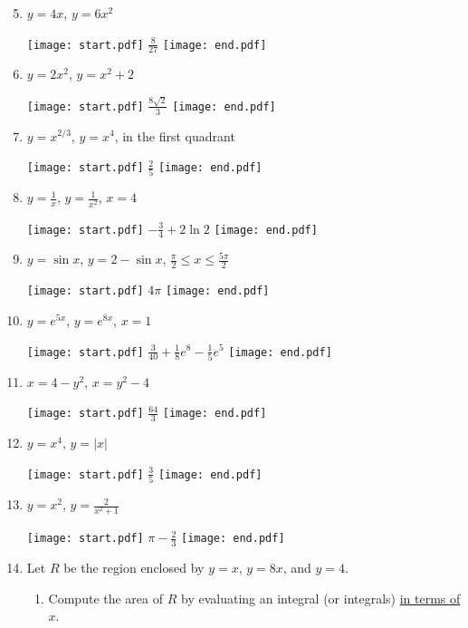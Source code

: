 \documentclass[12pt]{article}
\begin{document}
\begin{enumerate}
\setcounter{enumi}{4}

\item $y=4x$, $y=6x^2$

\texttt{[image: start.pdf]}
{{$\frac{8}{27}$}}
\texttt{[image: end.pdf]}


\item $y=2x^2$, $y=x^2+2$

\texttt{[image: start.pdf]}
{{$\frac{8\sqrt{2}}{3}$}}
\texttt{[image: end.pdf]}


\item $y=x^{2/3}$, $y=x^4$, in the first quadrant

\texttt{[image: start.pdf]}
{{$\frac{2}{5}$}}
\texttt{[image: end.pdf]}


\item $y=\frac{1}{x}$, $y=\frac{1}{x^2}$, $x=4$

\texttt{[image: start.pdf]}
{{$-\frac{3}{4}+2\ln{2}$}}
\texttt{[image: end.pdf]}


\item $y=\sin{x}$, $y=2-\sin{x}$, $\frac{\pi}{2}\leq x \leq \frac{5\pi}{2}$

\texttt{[image: start.pdf]}
{{$4\pi$}}
\texttt{[image: end.pdf]}


\item $y=e^{5x}$, $y=e^{8x}$, $x=1$

\texttt{[image: start.pdf]}
{{$\frac{3}{40}+\frac{1}{8}e^{8}-\frac{1}{5}e^5$}}
\texttt{[image: end.pdf]}


\item $x=4-y^2$, $x=y^2-4$

\texttt{[image: start.pdf]}
{{$\frac{64}{3}$}}
\texttt{[image: end.pdf]}


\item $y=x^4$, $y=|x|$

\texttt{[image: start.pdf]}
{{$\frac{3}{5}$}}
\texttt{[image: end.pdf]}


\item $y=x^2$, $y=\frac{2}{x^2+1}$

\texttt{[image: start.pdf]}
{{$\pi-\frac{2}{3}$}}
\texttt{[image: end.pdf]}


\newpage

\item Let $R$ be the region enclosed by $y=x$, $y=8x$, and $y=4$.  

\begin{enumerate}

\item Compute the area of $R$ by evaluating an integral (or integrals) \underline{in terms of $x$}.


\end{enumerate}
\end{enumerate}
\end{document}
